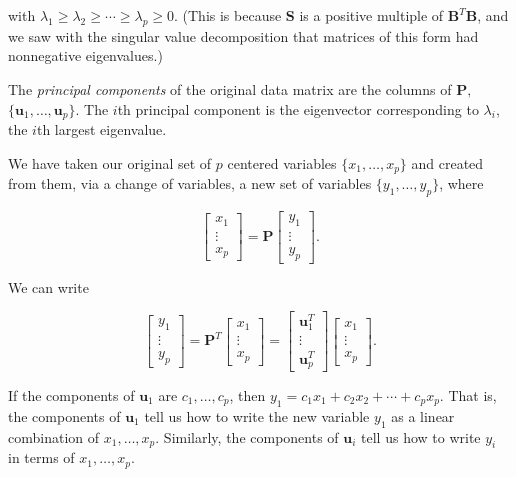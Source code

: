 \documentclass[
]{book}
\theoremstyle{definition}
\theoremstyle{definition}
\theoremstyle{definition}
\theoremstyle{definition}
\theoremstyle{remark}
\begin{document}
with \(\lambda_1\geq \lambda_2 \geq \cdots \geq \lambda_p\geq 0\). (This is because \(\mathbf{S}\) is a positive multiple of \(\mathbf{B}^T\mathbf{B}\), and we saw with the singular value decomposition that matrices of this form had nonnegative eigenvalues.)

The \emph{principal components} of the original data matrix are the columns of \(\mathbf{P},\) \(\{\mathbf{u}_1,\dots, \mathbf{u}_p\}\). The \(i\)th principal component is the eigenvector corresponding to \(\lambda_i\), the \(i\)th largest eigenvalue.

We have taken our original set of \(p\) centered variables \(\{x_1,\dots,x_p\}\) and created from them, via a change of variables, a new set of variables \(\{y_1,\dots,y_p\}\), where

\[\begin{bmatrix}x_1\\ \vdots \\ x_p\end{bmatrix}=\mathbf{P}\begin{bmatrix} y_1\\ \vdots \\ y_p\end{bmatrix}.\]

We can write

\[\begin{bmatrix} y_1\\ \vdots \\ y_p\end{bmatrix}=\mathbf{P}^T\begin{bmatrix}x_1\\ \vdots \\ x_p\end{bmatrix}=\begin{bmatrix} \mathbf{u}_1^T\\ \vdots \\ \mathbf{u}_p^T\end{bmatrix}\begin{bmatrix}x_1\\ \vdots \\ x_p\end{bmatrix}.\]

If the components of \(\mathbf{u}_1\) are \(c_1,\dots,c_p\), then \(y_1=c_1x_1+c_2x_2+\cdots+c_px_p\). That is, the components of \(\mathbf{u}_1\) tell us how to write the new variable \(y_1\) as a linear combination of \(x_1,\dots,x_p\). Similarly, the components of \(\mathbf{u}_i\) tell us how to write \(y_i\) in terms of \(x_1,\dots,x_p\).
\end{document}
